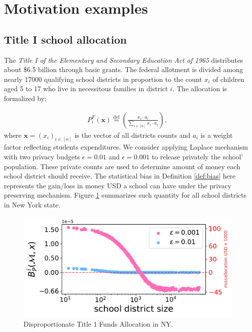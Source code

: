 \documentclass[9pt,twocolumn,twoside,lineno]{pnas-new}
\begin{document}
  

\section*{Motivation examples}
\subsection{Title I school allocation}
The \emph{Title I of the Elementary and Secondary Education Act of
  1965} \cite{Sonnenberg:16} distributes about \$6.5 billion through
basic grants. The federal allotment is divided among nearly 17000 qualifying school
districts in proportion to the count $x_i$ of children aged 5 to 17
who live in necessitous families in district $i$.
The allocation is formalized by:
\newcommand{\tfa}{P^F}
\newcommand{\rev}[1]{{\color{purple}{#1}}}
\newcommand{\add}[1]{{\color{darkgreen}{#1}}}
\newcommand*{\defeq}{\stackrel{\text{def}}{=}}
\def\aux{\mathrm{aux}}

\begin{align}
\label{eq:allotment}%
  \tfa_i(\bm{x}) \defeq \left( 
    \frac{x_i \cdot a_i}{\sum_{i \in [n] }x_i \cdot a_i}\right),
\end{align}
where $\bm{x} = (x_i)_{i\in[n]}$ is the vector of all districts counts 
and $a_i$ is a weight factor reflecting students expenditures.  We consider applying Laplace mechanism with two privacy budgets $\epsilon =  0.01$ and $\epsilon = 0.001$ to release privately the school' population. These private counts are used to determine amount of money each school district should receive. The statistical bias in Definition \ref{def:bias} here represents the gain/loss in money USD a school can have under the privacy preserving mechanism. Figure \ref{fig:p1motivation} summarizes such quantity for all school districts in New York state. 

\begin{figure}[h]
\centering
\includegraphics[width=0.7\linewidth]{images/fig2.pdf}
\caption{Disproportionate Title 1 Funds Allocation in NY.}
\label{fig:p1motivation}
\end{figure}
\end{document}
